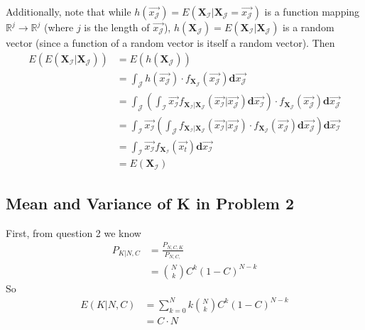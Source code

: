 \documentclass[paper=a4, fontsize=11pt]{scrartcl} %
\numberwithin{equation}{section} %
\numberwithin{figure}{section} %
\numberwithin{table}{section} %
\begin{document}
Additionally, note that while $h(\vec{x_{\mathcal{J}}}) = E(\mathbf{X_{\mathcal{I}}} | \mathbf{X_{\mathcal{J}}} = \vec{x_{\mathcal{J}}})$ is a function mapping $\mathbb{R}^j \to \mathbb{R}^j$ (where $j$ is the length of $\vec{x_{\mathcal{J}}}$), $h(\mathbf{X_{\mathcal{J}}}) = E(\mathbf{X_{\mathcal{I}}} | \mathbf{X_{\mathcal{J}}})$ is a random vector (since a function of a random vector is itself a random vector).
Then
\begin{align*}
E(E(\mathbf{X_{\mathcal{I}}} | \mathbf{X_{\mathcal{J}}})) &= E(h(\mathbf{X_{\mathcal{J}}}))\\
   &= \int_{\mathbf{{\mathcal{J}}}} h(\vec{x_{\mathcal{J}}}) \cdot f_{ \mathbf{X_{\mathcal{J}}}}(\vec{x_{\mathcal{J}}})\mathbf{d}\vec{x_{\mathcal{J}}}\\
   &= \int_{\mathbf{{\mathcal{J}}}}\left( \int_{\mathbf{{\mathcal{I}}}} \vec{x_{\mathcal{I}}} f_{ \mathbf{X_{\mathcal{I}}} |  \mathbf{X_{\mathcal{J}}}}(\vec{x_{\mathcal{I}}} | \vec{x_{\mathcal{J}}}) \mathbf{d}\vec{x_{\mathcal{I}}} \right) \cdot f_{ \mathbf{X_{\mathcal{J}}}}(\vec{x_{\mathcal{J}}}) \mathbf{d}\vec{x_{\mathcal{J}}}\\
    &= \int_{\mathbf{{\mathcal{I}}}} \vec{x_{\mathcal{I}}} \left( \int_{\mathbf{{\mathcal{J}}}} f_{ \mathbf{X_{\mathcal{I}}} |  \mathbf{X_{\mathcal{J}}}}(\vec{x_{\mathcal{I}}} | \vec{x_{\mathcal{J}}}) \cdot f_{ \mathbf{X_{\mathcal{J}}}}(\vec{x_{\mathcal{J}}}) \mathbf{d}\vec{x_{\mathcal{J}}} \right) \mathbf{d}\vec{x_{\mathcal{I}}} \\
     &= \int_{\mathbf{{\mathcal{I}}}} \vec{x_{\mathcal{I}}} f_{ \mathbf{X_{\mathcal{I}}}}(\vec{x_t}) \mathbf{d}\vec{x_{\mathcal{I}}} \\
     &= E(\mathbf{X_{\mathcal{I}}})
\end{align*}

\subsection{Mean and Variance of K in Problem 2}

First, from question 2 we know
\begin{align*}
P_{K | N, C} &= \frac{P_{N, C, K}}{P_{N, C,}}\\
   &= {N \choose k} C^{k} (1 - C)^{N-k}
\end{align*}
So
\begin{align*}
E(K | N, C) &= \sum_{k = 0}^N k{N \choose k} C^{k} (1 - C)^{N-k}\\
   &= C\cdot N
\end{align*}
\end{document}
